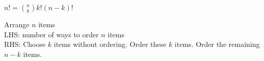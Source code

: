 \question $n! = \binom{n}{k}k!(n - k)!$ \\

\begin{solution}[3 cm]
Arrange $n$ items \\
LHS: number of ways to order $n$ items \\
RHS: Choose $k$ items without ordering. Order these $k$ items. 
Order the remaining $n - k$ items.
\end{solution}